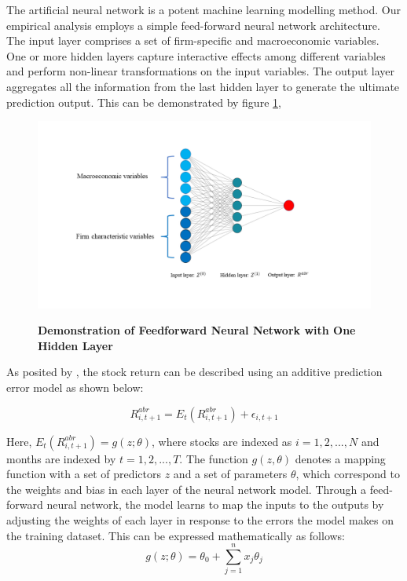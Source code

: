The artificial neural network is a potent machine learning modelling method. Our empirical analysis employs a simple feed-forward neural network architecture. The input layer comprises a set of firm-specific and macroeconomic variables. One or more hidden layers capture interactive effects among different variables and perform non-linear transformations on the input variables. The output layer aggregates all the information from the last hidden layer to generate the ultimate prediction output. This can be demonstrated by figure \ref{fig: ff-neural network},

\begin{figure}[H]
  \centering
  \caption{\textbf{Demonstration of Feedforward Neural Network with One Hidden Layer}}
  \includegraphics[width=.8\textwidth]{images/fnw_demonstration.png}
  \label{fig: ff-neural network}
\end{figure} 

As posited by \citet*{gu2020empirical}, the stock return can be described using an additive prediction error model as shown below:

\begin{equation}
\label{eqn: generalized model}
R^{abr}_{i,t+1} = E_t(R^{abr}_{i,t+1}) + \epsilon_{i,t+1}
\end{equation}

Here, $E_t(R^{abr}_{i,t+1}) = g(z;\theta)$, where stocks are indexed as $i=1,2,...,N$ and months are indexed by $t=1,2,...,T$. The function $g(z,\theta)$ denotes a mapping function with a set of predictors $z$ and a set of parameters $\theta$, which correspond to the weights and bias in each layer of the neural network model. Through a feed-forward neural network, the model learns to map the inputs to the outputs by adjusting the weights of each layer in response to the errors the model makes on the training dataset. This can be expressed mathematically as follows:
\begin{equation}
  \label{eqn:update weights}
  g(z;\theta) = \theta_0 + \sum^n_{j=1}x_j\theta_j
  \end{equation}

